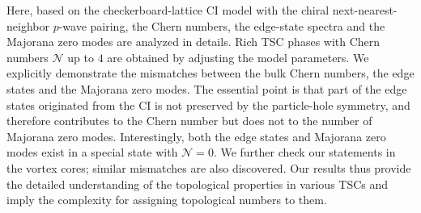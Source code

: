 \documentclass[12pt]{iopart}
\begin{document}
Here, based on the checkerboard-lattice CI model with the chiral next-nearest-neighbor $p$-wave pairing, the Chern numbers, the edge-state spectra and the Majorana zero modes are analyzed in details. Rich TSC phases with Chern numbers $\mathcal{N}$ up to $4$ are obtained by adjusting the model parameters. We explicitly demonstrate the mismatches between the bulk Chern numbers, the edge states and the Majorana zero modes. The essential point is that part of the edge states originated from the CI is not preserved by the particle-hole symmetry, and therefore contributes to the Chern number but does not to the number of Majorana zero modes. Interestingly, both the edge states and Majorana zero modes exist in a special state with $\mathcal{N}=0$. We further check our statements in the vortex cores; similar mismatches are also discovered. Our results thus provide the detailed understanding of the topological properties in various TSCs and imply the complexity for assigning topological numbers to them.
\end{document}
